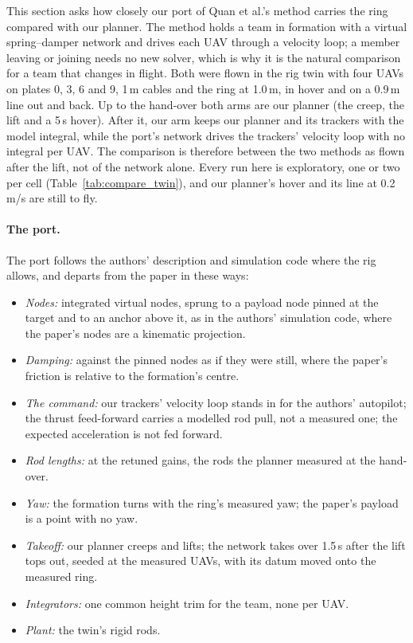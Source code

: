 This section asks how closely our port of Quan et al.'s method \cite{quan2025swarm} carries the ring compared with
our planner. The method holds a team in formation with a virtual spring--damper network and drives each UAV through
a velocity loop; a member leaving or joining needs no new solver, which is why it is the natural comparison for a
team that changes in flight. Both were flown in the rig twin with four UAVs on plates 0, 3, 6 and 9, 1\,m cables and
the ring at 1.0\,m, in hover and on a 0.9\,m line out and back. Up to the hand-over both arms are our planner (the
creep, the lift and a 5\,s hover). After it, our arm keeps our planner and its trackers with the model integral,
while the port's network drives the trackers' velocity loop with no integral per UAV. The comparison is therefore
between the two methods as flown after the lift, not of the network alone. Every run here is exploratory, one or two
per cell (Table~\ref{tab:compare_twin}), and our planner's hover and its line at 0.2\,m/s are still to fly.

\paragraph{The port.} The port follows the authors' description and simulation code where the rig allows, and
departs from the paper in these ways:
\begin{itemize}
  \item \emph{Nodes:} integrated virtual nodes, sprung to a payload node pinned at the target and to an anchor above
  it, as in the authors' simulation code, where the paper's nodes are a kinematic projection.
  \item \emph{Damping:} against the pinned nodes as if they were still, where the paper's friction is relative to the
  formation's centre.
  \item \emph{The command:} our trackers' velocity loop stands in for the authors' autopilot; the thrust feed-forward
  carries a modelled rod pull, not a measured one; the expected acceleration is not fed forward.
  \item \emph{Rod lengths:} at the retuned gains, the rods the planner measured at the hand-over.
  \item \emph{Yaw:} the formation turns with the ring's measured yaw; the paper's payload is a point with no yaw.
  \item \emph{Takeoff:} our planner creeps and lifts; the network takes over 1.5\,s after the lift tops out, seeded at
  the measured UAVs, with its datum moved onto the measured ring.
  \item \emph{Integrators:} one common height trim for the team, none per UAV.
  \item \emph{Plant:} the twin's rigid rods.
\end{itemize}

